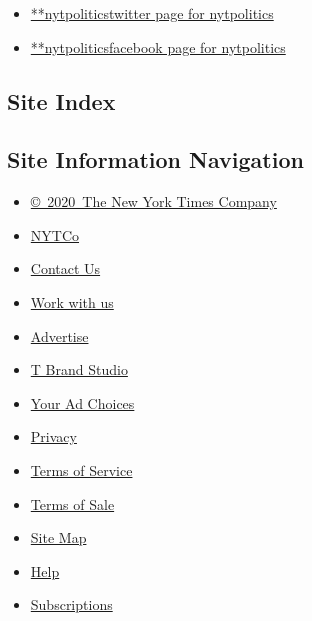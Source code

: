 \begin{itemize}
\tightlist
\item
  \href{https://twitter.com/nytpolitics}{**nytpoliticstwitter page for
  nytpolitics}
\item
  \href{https://www.facebook.com/nytpolitics}{**nytpoliticsfacebook page
  for nytpolitics}
\end{itemize}

\hypertarget{site-index}{%
\subsection{Site Index}\label{site-index}}

\hypertarget{site-information-navigation}{%
\subsection{Site Information
Navigation}\label{site-information-navigation}}

\begin{itemize}
\tightlist
\item
  \href{https://help.nytimes.com/hc/en-us/articles/115014792127-Copyright-notice}{©~2020~The
  New York Times Company}
\end{itemize}

\begin{itemize}
\tightlist
\item
  \href{https://www.nytco.com/}{NYTCo}
\item
  \href{https://help.nytimes.com/hc/en-us/articles/115015385887-Contact-Us}{Contact
  Us}
\item
  \href{https://www.nytco.com/careers/}{Work with us}
\item
  \href{https://nytmediakit.com/}{Advertise}
\item
  \href{http://www.tbrandstudio.com/}{T Brand Studio}
\item
  \href{https://www.nytimes.com/privacy/cookie-policy\#how-do-i-manage-trackers}{Your
  Ad Choices}
\item
  \href{https://www.nytimes.com/privacy}{Privacy}
\item
  \href{https://help.nytimes.com/hc/en-us/articles/115014893428-Terms-of-service}{Terms
  of Service}
\item
  \href{https://help.nytimes.com/hc/en-us/articles/115014893968-Terms-of-sale}{Terms
  of Sale}
\item
  \href{https://spiderbites.nytimes.com}{Site Map}
\item
  \href{https://help.nytimes.com/hc/en-us}{Help}
\item
  \href{https://www.nytimes.com/subscription?campaignId=37WXW}{Subscriptions}
\end{itemize}
